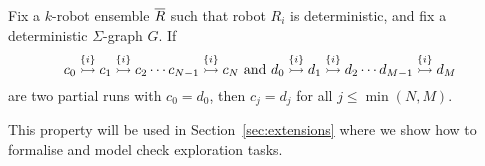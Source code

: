 \begin{lemma} \label{lem:deterministic}
Fix a $k$-robot ensemble $\tup{R}$ such that robot $R_i$ is deterministic, and fix a deterministic $\Sigma$-graph $G$.
If
\[
\onestep{c_0}{c_1}{\{i\}}\onestep{}{c_2}{\{i\}} \cdots \onestep{c_{N-1}}{c_N}{\{i\}} \mbox{ and }
\onestep{d_0}{d_1}{\{i\}}\onestep{}{d_2}{\{i\}} \cdots \onestep{d_{M-1}}{d_M}{\{i\}}
\]
are two partial runs with $c_0 = d_0$, then
$c_j = d_j$ for all $j \leq \min(N,M)$.
\end{lemma}

 This property will be used in Section~\ref{sec:extensions} where we show how to formalise and model check
exploration tasks.





